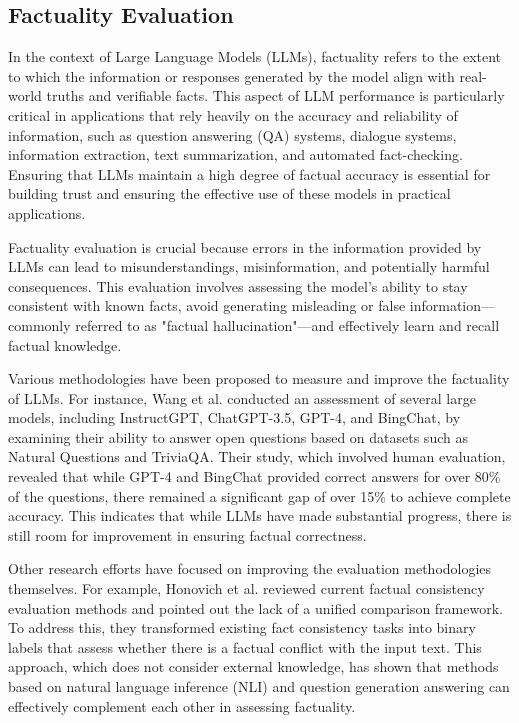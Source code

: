 \subsection{Factuality Evaluation}

In the context of Large Language Models (LLMs), factuality refers to the extent to which the information or responses generated by the model align with real-world truths and verifiable facts. This aspect of LLM performance is particularly critical in applications that rely heavily on the accuracy and reliability of information, such as question answering (QA) systems, dialogue systems, information extraction, text summarization, and automated fact-checking. Ensuring that LLMs maintain a high degree of factual accuracy is essential for building trust and ensuring the effective use of these models in practical applications.

Factuality evaluation is crucial because errors in the information provided by LLMs can lead to misunderstandings, misinformation, and potentially harmful consequences. This evaluation involves assessing the model’s ability to stay consistent with known facts, avoid generating misleading or false information—commonly referred to as "factual hallucination"—and effectively learn and recall factual knowledge.

Various methodologies have been proposed to measure and improve the factuality of LLMs. For instance, Wang et al. conducted an assessment of several large models, including InstructGPT, ChatGPT-3.5, GPT-4, and BingChat, by examining their ability to answer open questions based on datasets such as Natural Questions and TriviaQA. Their study, which involved human evaluation, revealed that while GPT-4 and BingChat provided correct answers for over 80\% of the questions, there remained a significant gap of over 15\% to achieve complete accuracy. This indicates that while LLMs have made substantial progress, there is still room for improvement in ensuring factual correctness.

Other research efforts have focused on improving the evaluation methodologies themselves. For example, Honovich et al. reviewed current factual consistency evaluation methods and pointed out the lack of a unified comparison framework. To address this, they transformed existing fact consistency tasks into binary labels that assess whether there is a factual conflict with the input text. This approach, which does not consider external knowledge, has shown that methods based on natural language inference (NLI) and question generation answering can effectively complement each other in assessing factuality.

